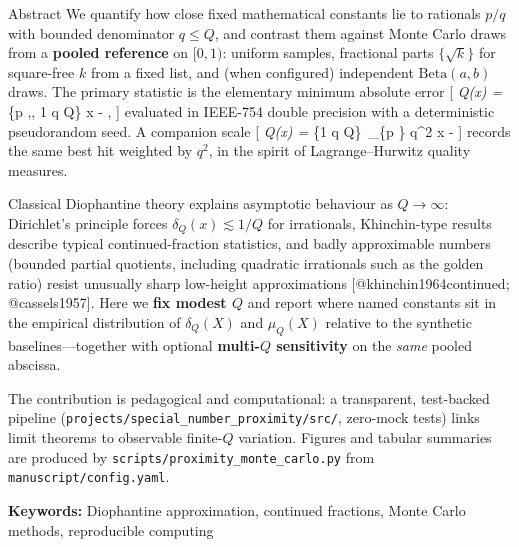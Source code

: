 \documentclass[
  ignorenonframetext,
]{beamer}
\author{\texorpdfstring{}{}}
\date{}
\begin{document}
\begin{frame}[fragile]{Abstract}
\protect{}\label{abstract}
We quantify how close fixed mathematical constants lie to rationals
\(p/q\) with bounded denominator \(q \leq Q\), and contrast them against
Monte Carlo draws from a \textbf{pooled reference} on \([0,1)\): uniform
samples, fractional parts \(\{\sqrt{k}\}\) for square-free \(k\) from a
fixed list, and (when configured) independent \(\mathrm{Beta}(a,b)\)
draws. The primary statistic is the elementary minimum absolute error
{[} \delta\emph{Q(x) = \min}\{p \in {},, 1 \leq q \leq Q\}
\left\textbar{} x -  \right\textbar, {]} evaluated in
IEEE-754 double precision with a deterministic pseudorandom seed. A
companion scale {[} \mu\emph{Q(x) = \min}\{1 \leq q \leq Q\}~\min\_\{p
\in {}\} q\^{}2 \left\textbar{} x -  \right\textbar{}
{]} records the same best hit weighted by \(q^2\), in the spirit of
Lagrange--Hurwitz quality measures.

Classical Diophantine theory explains asymptotic behaviour as
\(Q \to \infty\): Dirichlet's principle forces
\(\delta_Q(x) \lesssim 1/Q\) for irrationals, Khinchin-type results
describe typical continued-fraction statistics, and badly approximable
numbers (bounded partial quotients, including quadratic irrationals such
as the golden ratio) resist unusually sharp low-height approximations
{[}@khinchin1964continued; @cassels1957{]}. Here we \textbf{fix modest
\(Q\)} and report where named constants sit in the empirical
distribution of \(\delta_Q(X)\) and \(\mu_Q(X)\) relative to the
synthetic baselines---together with optional \textbf{multi-\(Q\)
sensitivity} on the \emph{same} pooled abscissa.

The contribution is pedagogical and computational: a transparent,
test-backed pipeline (\texttt{projects/special\_number\_proximity/src/},
zero-mock tests) links limit theorems to observable finite-\(Q\)
variation. Figures and tabular summaries are produced by
\texttt{scripts/proximity\_monte\_carlo.py} from
\texttt{manuscript/config.yaml}.

\textbf{Keywords:} Diophantine approximation, continued fractions, Monte
Carlo methods, reproducible computing
\end{frame}
\end{document}

